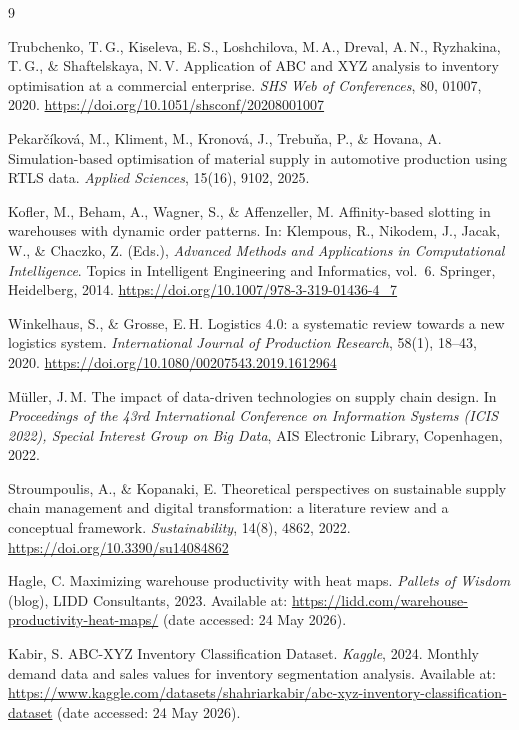 \documentclass[12pt,a4paper]{article}
\begin{document}
\newpage
\begin{thebibliography}{9}

Trubchenko, T.\,G., Kiseleva, E.\,S., Loshchilova, M.\,A., Dreval, A.\,N., Ryzhakina, T.\,G., \& Shaftelskaya, N.\,V.
Application of ABC and XYZ analysis to inventory optimisation at a commercial enterprise.
\textit{SHS Web of Conferences}, 80, 01007, 2020.
\url{https://doi.org/10.1051/shsconf/20208001007}

Pekar\v{c}\'{i}kov\'{a}, M., Kliment, M., Kronov\'{a}, J., Trebu\v{n}a, P., \& Hovana, A.
Simulation-based optimisation of material supply in automotive production using RTLS data.
\textit{Applied Sciences}, 15(16), 9102, 2025.

Kofler, M., Beham, A., Wagner, S., \& Affenzeller, M.
Affinity-based slotting in warehouses with dynamic order patterns.
In: Klempous, R., Nikodem, J., Jacak, W., \& Chaczko, Z. (Eds.),
\textit{Advanced Methods and Applications in Computational Intelligence}.
Topics in Intelligent Engineering and Informatics, vol.~6.
Springer, Heidelberg, 2014.
\url{https://doi.org/10.1007/978-3-319-01436-4_7}

Winkelhaus, S., \& Grosse, E.\,H.
Logistics 4.0: a systematic review towards a new logistics system.
\textit{International Journal of Production Research}, 58(1), 18--43, 2020.
\url{https://doi.org/10.1080/00207543.2019.1612964}

M\"{u}ller, J.\,M.
The impact of data-driven technologies on supply chain design.
In \textit{Proceedings of the 43rd International Conference on Information Systems
(ICIS 2022), Special Interest Group on Big Data}, AIS Electronic Library, Copenhagen, 2022.

Stroumpoulis, A., \& Kopanaki, E.
Theoretical perspectives on sustainable supply chain management and digital
transformation: a literature review and a conceptual framework.
\textit{Sustainability}, 14(8), 4862, 2022.
\url{https://doi.org/10.3390/su14084862}

Hagle, C. Maximizing warehouse productivity with heat maps.
\textit{Pallets of Wisdom} (blog), LIDD Consultants, 2023.
Available at: \url{https://lidd.com/warehouse-productivity-heat-maps/}
(date accessed: 24 May 2026).

Kabir, S. ABC-XYZ Inventory Classification Dataset.
\textit{Kaggle}, 2024.
Monthly demand data and sales values for inventory segmentation analysis.
Available at: \url{https://www.kaggle.com/datasets/shahriarkabir/abc-xyz-inventory-classification-dataset}
(date accessed: 24 May 2026).


\end{thebibliography}
\end{document}
